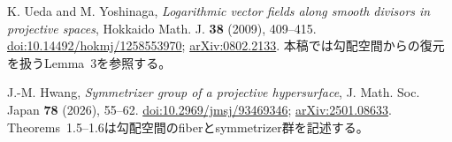 K. Ueda and M. Yoshinaga,
\emph{Logarithmic vector fields along smooth divisors in projective spaces},
Hokkaido Math. J. \textbf{38} (2009), 409--415.
\href{https://doi.org/10.14492/hokmj/1258553970}{doi:10.14492/hokmj/1258553970};
\href{https://arxiv.org/abs/0802.2133}{arXiv:0802.2133}.
本稿では勾配空間からの復元を扱うLemma~3を参照する。

J.-M. Hwang,
\emph{Symmetrizer group of a projective hypersurface},
J. Math. Soc. Japan \textbf{78} (2026), 55--62.
\href{https://doi.org/10.2969/jmsj/93469346}{doi:10.2969/jmsj/93469346};
\href{https://arxiv.org/abs/2501.08633}{arXiv:2501.08633}.
Theorems~1.5--1.6は勾配空間のfiberとsymmetrizer群を記述する。
